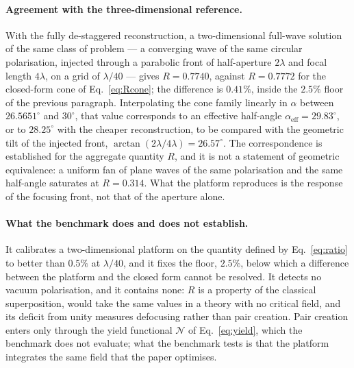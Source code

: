 \documentclass[aps,prd,reprint,superscriptaddress,nofootinbib,floatfix]{revtex4-2}
\begin{document}
\paragraph{Agreement with the three-dimensional reference.} With the fully
de-staggered reconstruction, a two-dimensional full-wave solution of the same
class of problem --- a converging wave of the same circular polarisation,
injected through a parabolic front of half-aperture $2\lambda$ and focal
length $4\lambda$, on a grid of $\lambda/40$ --- gives $R=0.7740$, against
$R=0.7772$ for the closed-form cone of Eq.~\eqref{eq:Rcone}; the difference is
$0.41\%$, inside the $2.5\%$ floor of the previous paragraph. Interpolating
the cone family linearly in $\alpha$ between $26.5651^\circ$ and
$30^\circ$, that value corresponds to an effective half-angle
$\alpha_{\mathrm{eff}}=29.83^\circ$, or to $28.25^\circ$ with the cheaper
reconstruction, to be compared with the geometric tilt of the injected front,
$\arctan(2\lambda/4\lambda)=26.57^\circ$. The correspondence is established
for the aggregate quantity $R$, and it is not a statement of geometric
equivalence: a uniform fan of plane waves of the same polarisation and the
same half-angle saturates at $R=0.314$. What the platform reproduces is the
response of the focusing front, not that of the aperture alone.

\paragraph{What the benchmark does and does not establish.} It calibrates a
two-dimensional platform on the quantity defined by Eq.~\eqref{eq:ratio} to
better than $0.5\%$ at $\lambda/40$, and it fixes the floor, $2.5\%$, below
which a difference between the platform and the closed form cannot be
resolved. It detects no vacuum polarisation, and it contains none: $R$ is a
property of the classical superposition, would take the same values in a
theory with no critical field, and its deficit from unity measures defocusing
rather than pair creation. Pair creation enters only through the yield
functional $\mathcal{N}$ of Eq.~\eqref{eq:yield}, which the benchmark does not
evaluate; what the benchmark tests is that the platform integrates the same
field that the paper optimises.
\end{document}
